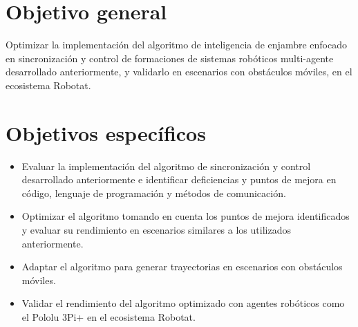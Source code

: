 \section{Objetivo general}
Optimizar la implementación del algoritmo de inteligencia de enjambre enfocado en sincronización y control de formaciones de sistemas robóticos multi-agente desarrollado anteriormente, y validarlo en escenarios con obstáculos móviles, en el ecosistema Robotat.

\section{Objetivos específicos}
\begin{itemize}
	\item Evaluar la implementación del algoritmo de sincronización y control desarrollado anteriormente e identificar deficiencias y puntos de mejora en código, lenguaje de programación y métodos de comunicación.

	\item Optimizar el algoritmo tomando en cuenta los puntos de mejora identificados y evaluar su rendimiento en escenarios similares a los utilizados anteriormente.
	
	\item Adaptar el algoritmo para generar trayectorias en escenarios con obstáculos móviles.
	
	\item Validar el rendimiento del algoritmo optimizado con agentes robóticos como el Pololu 3Pi+ en el ecosistema Robotat.
\end{itemize}